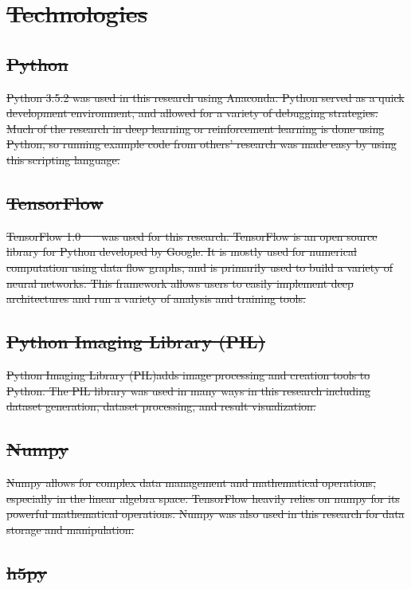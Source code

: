 \documentclass[12pt,american]{report}
\providecommand{\DIFdeltex}[1]{{\protect\color{red}\sout{#1}}}                      %
\providecommand{\DIFdel}[1]{\texorpdfstring{\DIFdeltex{#1}}{}} %
\begin{document}
\section{\DIFdel{Technologies}}
\addtocounter{section}{-1}%
\subsection{\DIFdel{Python}}
\addtocounter{subsection}{-1}%
\DIFdel{Python 3.5.2 was used in this research using Anaconda.  Python served as a quick development environment, and allowed for a variety of debugging strategies.  Much of the research in deep learning or reinforcement learning is done using Python, so running example code from others' research was made easy by using this scripting language.
}\subsection{\DIFdel{TensorFlow}}
\addtocounter{subsection}{-1}%
\DIFdel{TensorFlow 1.0~\mbox{%
\cite{tensorflow2015-whitepaper} }%
was used for this research.  TensorFlow is an open source library for Python developed by Google.  It is mostly used for numerical computation using data flow graphs, and is primarily used to build a variety of neural networks.  This framework allows users to easily implement deep architectures and run a variety of analysis and training tools.  
}\subsection{\DIFdel{Python Imaging Library (PIL)}}
\addtocounter{subsection}{-1}%
\DIFdel{Python Imaging Library (PIL)adds image processing and creation tools to Python. The PIL library was used in many ways in this research including dataset generation, dataset processing, and result visualization.
}\subsection{\DIFdel{Numpy}}
\addtocounter{subsection}{-1}%
\DIFdel{Numpy allows for complex data management and mathematical operations, especially in the linear algebra space.  TensorFlow heavily relies on numpy for its powerful mathematical operations.  Numpy was also used in this research for data storage and manipulation. 
}\subsection{\DIFdel{h5py}}
\end{document}
